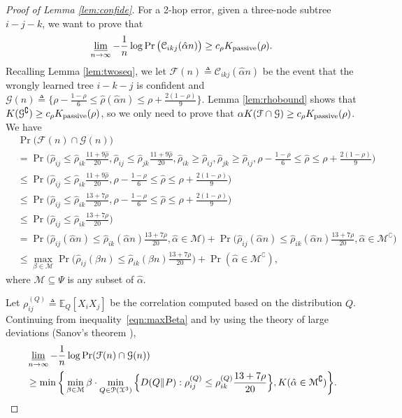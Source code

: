 \documentclass[11pt,onecolumn]{article}
\newcommand{\nn}{\nonumber}
\newcommand{\calC}{\mathcal{C}}
\newcommand{\calF}{\mathcal{F}}
\newcommand{\calG}{\mathcal{G}}
\newcommand{\calM}{\mathcal{M}}
\newcommand{\calP}{\mathcal{P}}
\newcommand{\calX}{\mathcal{X}}
\newcommand{\bbE}{\mathbb{E}}
\newcommand{\halpha}{\hat{\alpha}}
\newcommand{\hrho}{\hat{\rho}}
\newcommand{\Passive}{{\rm passive}}
\begin{document}
\begin{proof}[Proof of Lemma \ref{lem:confide}]
	For a 2-hop error, given a three-node subtree $i-j-k$, we want to prove  that
	\begin{align}
    	\varliminf_{n\rightarrow\infty}-\frac{1}{n}\log\Pr\big(\calC_{ikj}(\halpha n)\big)\geq c_{\rho}K _{\Passive}(\rho).
	\end{align}
	Recalling Lemma \ref{lem:twoseq}, we let $\calF(n)\triangleq\calC_{ikj}(\halpha n)$ be the event that the wrongly learned tree $i-k-j$ is confident and $\calG(n)\triangleq\big\{\rho-\frac{1-\rho}{6}\leq\hrho(\halpha n)\leq\rho+\frac{2(1-\rho)}{9}\big\}$. Lemma \ref{lem:rhobound} shows that $K (\calG^{\complement})\geq c_{\rho}K _{\Passive}(\rho)$, so we only need to prove that $\alpha K (\calF\cap \calG)\geq c_{\rho}K _{\Passive}(\rho)$. We have 
	\begin{align}
		&\Pr\big(\calF(n)\cap \calG(n)\big)\nonumber\\
		&=\Pr\bigg(\hrho_{ij}\!\leq\! \hrho_{ik}\frac{11+9\hrho}{20},\hrho_{ij}\!\leq\! \hrho_{jk}\frac{11+9\hrho}{20},\hrho_{ik}\!\geq\! \hrho_{ij},\hrho_{jk}\!\geq\! \hrho_{ij},\rho-\frac{1-\rho}{6}\!\leq\!\hrho\!\leq\!\rho+\frac{2(1-\rho)}{9}\bigg)\\
		&\leq\Pr\bigg(\hrho_{ij}\leq \hrho_{ik}\frac{11+9\hrho}{20}, \rho-\frac{1-\rho}{6}\leq\hrho\leq\rho+\frac{2(1-\rho)}{9}\bigg)\\
		&\leq\Pr\bigg(\hrho_{ij}\leq \hrho_{ik}\frac{13+7\rho}{20}, \rho-\frac{1-\rho}{6}\leq\hrho\leq\rho+\frac{2(1-\rho)}{9}\bigg)\\
		&\leq\Pr\bigg(\hrho_{ij}\leq \hrho_{ik}\frac{13+7\rho}{20}\bigg)\\
		&=\Pr\Big(\hrho_{ij}(\halpha n)\leq \hrho_{ik}(\halpha n)\frac{13+7\rho}{20}, \halpha\in \calM\Big)+\Pr\Big(\hrho_{ij}(\halpha n)\leq \hrho_{ik}(\halpha n)\frac{13+7\rho}{20}, \halpha\in \calM^{\complement}\Big) \\
		&\leq \max_{\beta\in \calM}\Pr\Big(\hrho_{ij}(\beta n)\leq \hrho_{ik}(\beta n)\frac{13+7\rho}{20}\Big)+\Pr( \halpha\in \calM^{\complement}), \label{eqn:maxBeta}
	\end{align}
	where $\calM\subseteq \Psi$ is any  subset of $\halpha$.
	
	Let $\rho^{(Q)}_{ij}\triangleq\bbE_Q[X_iX_j]$ be the correlation computed based on the distribution $Q$. Continuing from inequality~\eqref{eqn:maxBeta} and  by using the theory of large deviations (Sanov's theorem \cite{zeitouni1998large}), 
	\begin{align}
		&\varliminf_{n\rightarrow\infty}-\frac{1}{n}\log\Pr(\calF(n)\cap \calG(n))\nn\\*
		&\geq \min\bigg\{\min_{\beta\in \calM} \beta\cdot \min_{Q\in\calP(\calX^{3})} \Big\{D(Q\|P):\rho^{(Q)}_{ij}\leq\rho^{(Q)}_{ik}\frac{13+7\rho}{20}\Big\},K (\halpha\in \calM^{\complement})\bigg\}. \label{eqn:mink}
	\end{align}


\end{proof}
\end{document}
